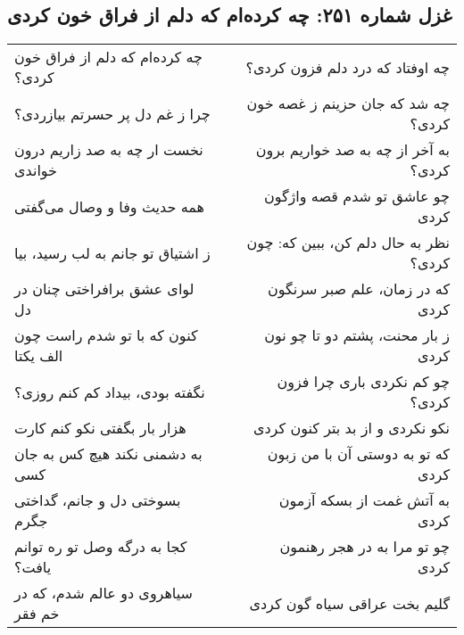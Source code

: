 \begin{center}
\section*{غزل شماره ۲۵۱: چه کرده‌ام که دلم از فراق خون کردی}
\label{sec:251}
\begin{longtable}{l p{0.5cm} r}
چه کرده‌ام که دلم از فراق خون کردی؟
&&
چه اوفتاد که درد دلم فزون کردی؟
\\
چرا ز غم دل پر حسرتم بیازردی؟
&&
چه شد که جان حزینم ز غصه خون کردی؟
\\
نخست ار چه به صد زاریم درون خواندی
&&
به آخر از چه به صد خواریم برون کردی؟
\\
همه حدیث وفا و وصال می‌گفتی
&&
چو عاشق تو شدم قصه واژگون کردی
\\
ز اشتیاق تو جانم به لب رسید، بیا
&&
نظر به حال دلم کن، ببین که: چون کردی؟
\\
لوای عشق برافراختی چنان در دل
&&
که در زمان، علم صبر سرنگون کردی
\\
کنون که با تو شدم راست چون الف یکتا
&&
ز بار محنت، پشتم دو تا چو نون کردی
\\
نگفته بودی، بیداد کم کنم روزی؟
&&
چو کم نکردی باری چرا فزون کردی؟
\\
هزار بار بگفتی نکو کنم کارت
&&
نکو نکردی و از بد بتر کنون کردی
\\
به دشمنی نکند هیچ کس به جان کسی
&&
که تو به دوستی آن با من زبون کردی
\\
بسوختی دل و جانم، گداختی جگرم
&&
به آتش غمت از بسکه آزمون کردی
\\
کجا به درگه وصل تو ره توانم یافت؟
&&
چو تو مرا به در هجر رهنمون کردی
\\
سیاهروی دو عالم شدم، که در خم فقر
&&
گلیم بخت عراقی سیاه گون کردی
\\
\end{longtable}
\end{center}
